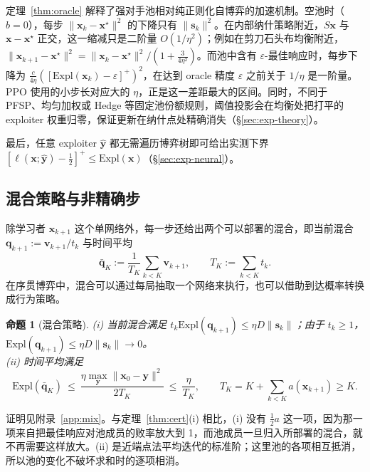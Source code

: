 \documentclass{article}
\theoremstyle{plain}
\newtheorem{proposition}[theorem]{命题}
\theoremstyle{remark}
\newcommand{\Expl}{\mathrm{Expl}}
\newcommand{\bx}{{\bm{x}}}
\newcommand{\by}{{\bm{y}}}
\newcommand{\bv}{{\bm{v}}}
\newcommand{\bq}{{\bm{q}}}
\newcommand{\xs}{\bx^{\star}}
\newcommand{\dx}{{\bm{s}}}
\begin{document}
定理~\ref{thm:oracle} 解释了强对手池相对纯正则化自博弈的加速机制。空池时（$b=0$），每步 $\|\bx_k-\xs\|^2$ 的下降只有 $\|\dx_k\|^2$。在内部纳什策略附近，$S\bx$ 与 $\bx-\xs$ 正交，这一缩减只是二阶量 $O(1/\eta^2)$；例如在剪刀石头布均衡附近，$\|\bx_{k+1}-\xs\|^2=\|\bx_k-\xs\|^2/(1+\tfrac{3}{4\eta^2})$。而池中含有 $\varepsilon$-最佳响应时，每步下降为 $\tfrac{c}{4\eta}([\Expl(\bx_k)-\varepsilon]^+)^2$，在达到 oracle 精度 $\varepsilon$ 之前关于 $1/\eta$ 是一阶量。PPO 使用的小步长对应大的 $\eta$，正是这一差距最大的区间。同时，不同于 PFSP、均匀加权或 Hedge 等固定池份额规则，阈值投影会在均衡处把打平的 exploiter 权重归零，保证更新在纳什点处精确消失（\S\ref{sec:exp-theory}）。

最后，任意 exploiter $\hat\by$ 都无需遍历博弈树即可给出实测下界 $[\ell(\bx;\hat\by)-\tfrac12]^+\le\Expl(\bx)$（\S\ref{sec:exp-neural}）。

\subsection{混合策略与非精确步}
\label{sec:inexact}

除学习者 $\bx_{k+1}$ 这个单网络外，每一步还给出两个可以部署的混合，即当前混合 $\bq_{k+1}:=\bv_{k+1}/t_k$ 与时间平均
\[
\bar{\bq}_K:=\frac1{T_K}\sum_{k<K}\bv_{k+1},\qquad T_K:=\sum_{k<K}t_k .
\]
在序贯博弈中，混合可以通过每局抽取一个网络来执行，也可以借助到达概率转换成行为策略\citep{kuhn1953}。
\begin{proposition}[混合策略]
\label{prop:mix}
(i) 当前混合满足 $t_k\Expl(\bq_{k+1})\le\eta D\|\dx_k\|$；由于 $t_k\ge1$，$\Expl(\bq_{k+1})\le\eta D\|\dx_k\|\to0$。\\
(ii) 时间平均满足
\[
\Expl(\bar{\bq}_K)\ \le\ \frac{\eta\max_\by\|\bx_0-\by\|^2}{2T_K}\ \le\ \frac{\eta}{T_K},\qquad T_K=K+\textstyle\sum_{k<K}a(\bx_{k+1})\ge K.
\]
\end{proposition}
证明见附录~\ref{app:mix}。与定理~\ref{thm:cert}(i) 相比，(i) 没有 $\tfrac12a$ 这一项，因为那一项来自把最佳响应对池成员的败率放大到 1，而池成员一旦归入所部署的混合，就不再需要这样放大。(ii) 是近端点法平均迭代的标准阶\citep{rockafellar1976ppa,nemirovski2004prox}；这里池的各项相互抵消，所以池的变化不破坏求和时的逐项相消。
\end{document}
